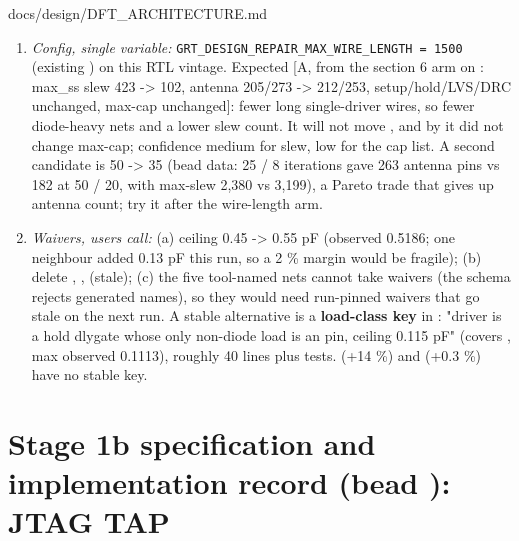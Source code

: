 \begin{relocated}{docs/design/DFT_ARCHITECTURE.md}
\begin{enumerate}
\def\labelenumi{\arabic{enumi}.}
\tightlist
\item
  \emph{Config, single variable:}
  \texttt{GRT\_\allowbreak{}DESIGN\_\allowbreak{}REPAIR\_\allowbreak{}MAX\_\allowbreak{}WIRE\_\allowbreak{}LENGTH\ =\allowbreak{}\ 1500}
  (existing ) on this RTL vintage.
  Expected {[}A, from the  section 6 arm on
  : max\_ss slew 423 -\textgreater{} 102,
  antenna 205/273 -\textgreater{} 212/253,
  setup/\allowbreak{}hold/\allowbreak{}LVS/\allowbreak{}DRC unchanged,
  max-cap unchanged{]}: fewer long single-driver wires, so fewer
  diode-heavy nets and a lower slew count. It will not move
  , and by  it did not change max-cap;
  confidence medium for slew, low for the cap list. A second candidate
  is  50 -\textgreater{} 35 (bead 
  data: 25 / 8 iterations gave 263 antenna pins vs 182 at 50 / 20, with
  max-slew 2,380 vs 3,199), a Pareto trade that gives up antenna count;
  try it after the wire-length arm.
\item
  \emph{Waivers, user\textquotesingle s call:} (a)
   ceiling 0.45 -\textgreater{} 0.55
  pF (observed 0.5186; one neighbour added 0.13 pF this run, so a 2 \%
  margin would be fragile); (b) delete ,
  , 
  (stale); (c) the five tool-named nets cannot take 
  waivers (the schema rejects generated names), so they would need
  run-pinned waivers that go stale on the next run. A stable alternative
  is a \textbf{load-class key} in : "driver
  is a hold dlygate whose only non-diode load is an  pin,
  ceiling 0.115 pF" (covers , max observed
  0.1113), roughly 40 lines plus tests.  (+14 \%) and
   (+0.3 \%) have no stable key.
\end{enumerate}

\section{\texorpdfstring{Stage 1b specification and implementation
record (bead ): JTAG
TAP}{Stage 1b specification and implementation record (bead ): JTAG TAP}}\label{tm:ch:dft-architecture:15-stage-1b-specification-and-implementation-record-bead-j41m3-jtag-tap}


\end{relocated}
